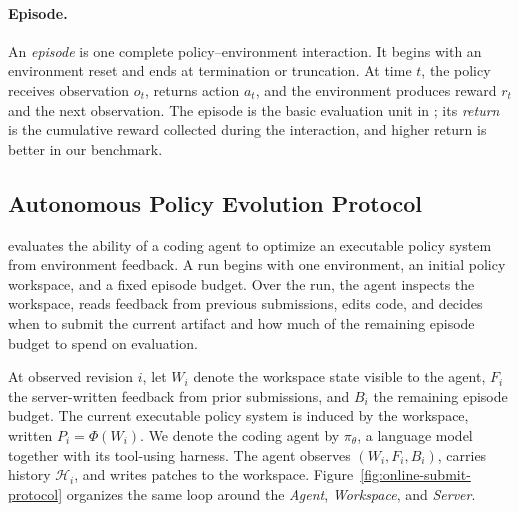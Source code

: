 \paragraph{Episode.}
An \emph{episode} is one complete policy--environment interaction. It begins
with an environment reset and ends at termination or truncation. At time $t$,
the policy receives observation $o_t$, returns action $a_t$, and the environment
produces reward $r_t$ and the next observation. The episode is the basic
evaluation unit in \evopolicygym{}; its \emph{return} is the cumulative reward
collected during the interaction, and higher return is better in our benchmark.

\subsection{Autonomous Policy Evolution Protocol}
\label{sec:ape}


\evopolicygym{} evaluates the ability of a coding agent to optimize an
executable policy system from environment feedback. A run begins with one
environment, an initial policy workspace, and a fixed episode budget. Over the
run, the agent inspects the workspace, reads feedback from previous
submissions, edits code, and decides when to submit the current artifact and
how much of the remaining episode budget to spend on evaluation.

At observed revision $i$, let $W_i$ denote the workspace state visible to the
agent, $F_i$ the server-written feedback from prior submissions, and $B_i$ the
remaining episode budget. The current executable policy system is induced by
the workspace, written $P_i=\Phi(W_i)$. We denote the coding agent by
$\pi_\theta$, a language model together with its tool-using harness. The agent
observes $(W_i,F_i,B_i)$, carries history $\mathcal{H}_i$, and writes patches
to the workspace.
Figure~\ref{fig:online-submit-protocol} organizes the same loop around the
\emph{Agent}, \emph{Workspace}, and \emph{Server}.


